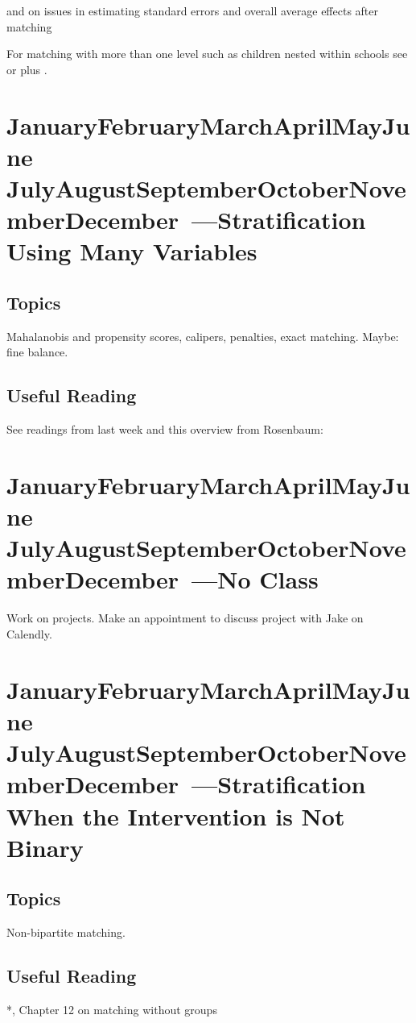\documentclass[10pt]{article}
\def\themonth{\ifcase\month\or
        January\or February\or March\or April\or May\or June\or
    July\or August\or September\or October\or November\or December\fi}
\begin{document}
     and  on issues in estimating standard errors and overall average effects after matching

    For matching with more than one level such as children nested within schools see \cite{zubizarreta2012using} or \cite{zubizarreta2017optimal} plus \cite{pimentel2018optimal}.


    \AdvanceDate[7]
    \section{\themonth~\the\day---Stratification Using Many Variables}

    \subsection{Topics} Mahalanobis and propensity scores, calipers, penalties,
    exact matching. Maybe: fine balance.

    \subsection{Useful Reading} See readings from last week and this overview from Rosenbaum:



    \AdvanceDate[7]
    \section*{\themonth~\the\day---No Class}

    Work on projects. Make an appointment to discuss project with Jake on Calendly.

    \AdvanceDate[7]
    \section{\themonth~\the\day---Stratification When the Intervention is Not Binary}

    \subsection{Topics} Non-bipartite matching.

    \subsection{Useful Reading}

    *, Chapter 12 on matching without groups
\end{document}
